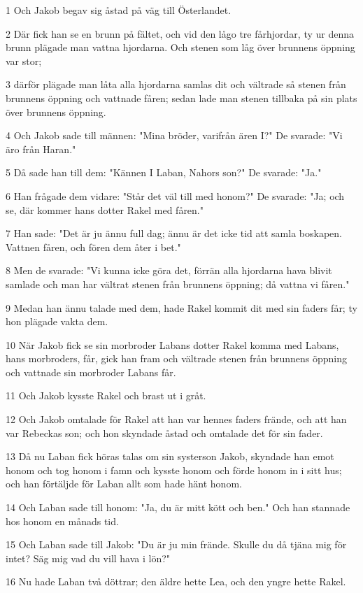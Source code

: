 \par 1 Och Jakob begav sig åstad på väg till Österlandet.
\par 2 Där fick han se en brunn på fältet, och vid den lågo tre fårhjordar, ty ur denna brunn plägade man vattna hjordarna. Och stenen som låg över brunnens öppning var stor;
\par 3 därför plägade man låta alla hjordarna samlas dit och vältrade så stenen från brunnens öppning och vattnade fåren; sedan lade man stenen tillbaka på sin plats över brunnens öppning.
\par 4 Och Jakob sade till männen: "Mina bröder, varifrån ären I?" De svarade: "Vi äro från Haran."
\par 5 Då sade han till dem: "Kännen I Laban, Nahors son?" De svarade: "Ja."
\par 6 Han frågade dem vidare: "Står det väl till med honom?" De svarade: "Ja; och se, där kommer hans dotter Rakel med fåren."
\par 7 Han sade: "Det är ju ännu full dag; ännu är det icke tid att samla boskapen. Vattnen fåren, och fören dem åter i bet."
\par 8 Men de svarade: "Vi kunna icke göra det, förrän alla hjordarna hava blivit samlade och man har vältrat stenen från brunnens öppning; då vattna vi fåren."
\par 9 Medan han ännu talade med dem, hade Rakel kommit dit med sin faders får; ty hon plägade vakta dem.
\par 10 När Jakob fick se sin morbroder Labans dotter Rakel komma med Labans, hans morbroders, får, gick han fram och vältrade stenen från brunnens öppning och vattnade sin morbroder Labans får.
\par 11 Och Jakob kysste Rakel och brast ut i gråt.
\par 12 Och Jakob omtalade för Rakel att han var hennes faders frände, och att han var Rebeckas son; och hon skyndade åstad och omtalade det för sin fader.
\par 13 Då nu Laban fick höras talas om sin systerson Jakob, skyndade han emot honom och tog honom i famn och kysste honom och förde honom in i sitt hus; och han förtäljde för Laban allt som hade hänt honom.
\par 14 Och Laban sade till honom: "Ja, du är mitt kött och ben." Och han stannade hos honom en månads tid.
\par 15 Och Laban sade till Jakob: "Du är ju min frände. Skulle du då tjäna mig för intet? Säg mig vad du vill hava i lön?"
\par 16 Nu hade Laban två döttrar; den äldre hette Lea, och den yngre hette Rakel.

